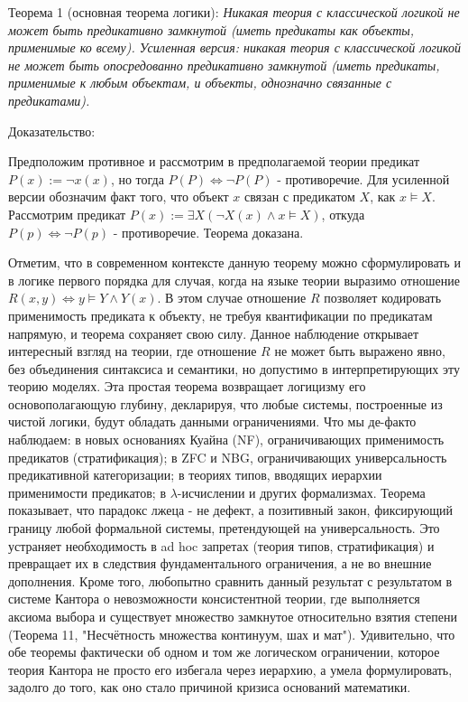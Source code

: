 \documentclass[12pt]{article}
\begin{document}
Теорема 1 (основная теорема логики): {\sl Никакая теория с классической логикой не может быть предикативно замкнутой (иметь предикаты как объекты, применимые ко всему). Усиленная версия: никакая теория с классической логикой не может быть опосредованно предикативно замкнутой (иметь предикаты, применимые к любым объектам, и объекты, однозначно связанные с предикатами).}

Доказательство: 

Предположим противное и рассмотрим в предполагаемой теории предикат $P(x) := \neg x(x)$, но тогда $P(P) \Leftrightarrow \neg P(P)$ - противоречие. Для усиленной версии обозначим факт того, что объект $x$ связан с предикатом $X$, как $x \models X$. Рассмотрим предикат $P(x) := \exists X (\neg X(x) \wedge x \models X)$, откуда $P(p) \Leftrightarrow \neg P(p)$ - противоречие. Теорема доказана.

Отметим, что в современном контексте данную теорему можно сформулировать и в логике первого порядка для случая, когда на языке теории выразимо отношение $R(x, y) \Leftrightarrow y \models Y \wedge Y(x)$. В этом случае отношение $R$ позволяет кодировать применимость предиката к объекту, не требуя квантификации по предикатам напрямую, и теорема сохраняет свою силу. Данное наблюдение открывает интересный взгляд на теории, где отношение $R$ не может быть выражено явно, без объединения синтаксиса и семантики, но допустимо в интерпретирующих эту теорию моделях. Эта простая теорема возвращает логицизму его основополагающую глубину, декларируя, что любые системы, построенные из чистой логики, будут обладать данными ограничениями. Что мы де-факто наблюдаем: в новых основаниях Куайна (NF), ограничивающих применимость предикатов (стратификация); в ZFC и NBG, ограничивающих универсальность предикативной категоризации; в теориях типов, вводящих иерархии применимости предикатов; в $\lambda$-исчислении и других формализмах. Теорема показывает, что парадокс лжеца - не дефект, а позитивный закон, фиксирующий границу любой формальной системы, претендующей на универсальность. Это устраняет необходимость в ad hoc запретах (теория типов, стратификация) и превращает их в следствия фундаментального ограничения, а не во внешние дополнения. Кроме того, любопытно сравнить данный результат с результатом в системе Кантора о невозможности консистентной теории, где выполняется аксиома выбора и существует множество замкнутое относительно взятия степени (Теорема 11, "Несчётность множества континуум, шах и мат"). Удивительно, что обе теоремы фактически об одном и том же логическом ограничении, которое теория Кантора не просто его избегала через иерархию, а умела формулировать, задолго до того, как оно стало причиной кризиса оснований математики.
\end{document}
